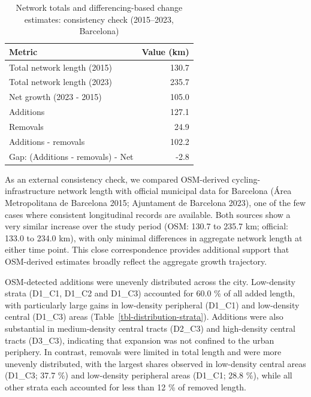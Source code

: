 \documentclass[
]{article}
\begin{document}
{

\begin{longtable}[]{@{}lr@{}}

\caption{\label{tbl-consistency}Network totals and differencing-based
change estimates: consistency check (2015--2023, Barcelona)}

\tabularnewline

\toprule\noalign{}
Metric & Value (km) \\
\midrule\noalign{}
\endhead
\bottomrule\noalign{}
\endlastfoot
Total network length (2015) & 130.7 \\
Total network length (2023) & 235.7 \\
Net growth (2023 - 2015) & 105.0 \\
Additions & 127.1 \\
Removals & 24.9 \\
Additions - removals & 102.2 \\
Gap: (Additions - removals) - Net & -2.8 \\

\end{longtable}

}

\color{blue}As an external consistency check, we compared OSM-derived
cycling-infrastructure network length with official municipal data for
Barcelona (Área Metropolitana de Barcelona 2015; Ajuntament de Barcelona
2023), one of the few cases where consistent longitudinal records are
available. Both sources show a very similar increase over the study
period (OSM: 130.7 to 235.7 km; official: 133.0 to 234.0 km), with only
minimal differences in aggregate network length at either time point.
This close correspondence provides additional support that OSM-derived
estimates broadly reflect the aggregate growth trajectory. \color{black}

OSM-detected additions were unevenly distributed across the city.
Low-density strata (D1\_C1, D1\_C2 and D1\_C3) accounted for 60.0 \% of
all added length, with particularly large gains in low-density
peripheral (D1\_C1) and low-density central (D1\_C3) areas
(Table~\ref{tbl-distribution-strata}). Additions were also substantial
in medium-density central tracts (D2\_C3) and high-density central
tracts (D3\_C3), indicating that expansion was not confined to the urban
periphery. In contrast, removals were limited in total length and were
more unevenly distributed, with the largest shares observed in
low-density central areas (D1\_C3; 37.7 \%) and low-density peripheral
areas (D1\_C1; 28.8 \%), while all other strata each accounted for less
than 12 \% of removed length.
\end{document}
